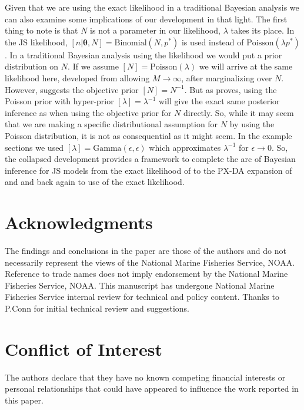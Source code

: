 \documentclass[12pt]{article}
\newcommand{\bt}{\ensuremath{\boldsymbol{\theta}}}
\begin{document}
Given that we are using the exact likelihood in a traditional Bayesian analysis we can also examine some implications of our development in that light. The first thing to note is that $N$ is not a parameter in our likelihood, $\lambda$ takes its place. In the \cite{schwarz1996general} JS likelihood, $[n|\bt, N] = \text{Binomial}(N,p^*)$ is used instead of $\text{Poisson}(\lambda p^*)$ \citep{king2015capture}. In a traditional Bayesian analysis using the likelihood we would put a prior distribution on $N$. If we assume $[N] = \text{Poisson}(\lambda)$ we will arrive at the same likelihood here, developed from allowing $M \to \infty$, after marginalizing over $N$. However, \cite{link2013cautionary} suggests the objective prior $[N]=N^{-1}$. But as \cite{schofield2023estimating} proves, using the Poisson prior with hyper-prior $[\lambda]=\lambda^{-1}$ will give the exact same posterior inference as when using the objective prior for $N$ directly. So, while it may seem that we are making a specific distributional assumption for $N$ by using the Poisson distribution, it is not as consequential as it might seem. In the example sections we used $[\lambda] = \text{Gamma}(\epsilon, \epsilon)$ which approximates $\lambda^{-1}$ for $\epsilon \to 0$. So, the collapsed development provides a framework to complete the arc of Bayesian inference for JS models from the exact likelihood of \cite{schwarz1996general} to the PX-DA expansion of \cite{Durban:2005yw} and \cite{Royle:2007kx} and back again to use of the exact likelihood. 



\section*{Acknowledgments}
The findings and conclusions in the paper are those of the authors and do not necessarily represent the views of the National Marine Fisheries Service, NOAA. Reference to trade names does not imply endorsement by the National Marine Fisheries Service, NOAA. This manuscript has undergone National Marine Fisheries Service internal review for technical and policy content. Thanks to P.Conn for initial technical review and suggestions. 

\section*{Conflict of Interest}

The authors declare that they have no known competing financial interests or personal relationships that could have appeared to influence the work reported in this paper.
\end{document}
